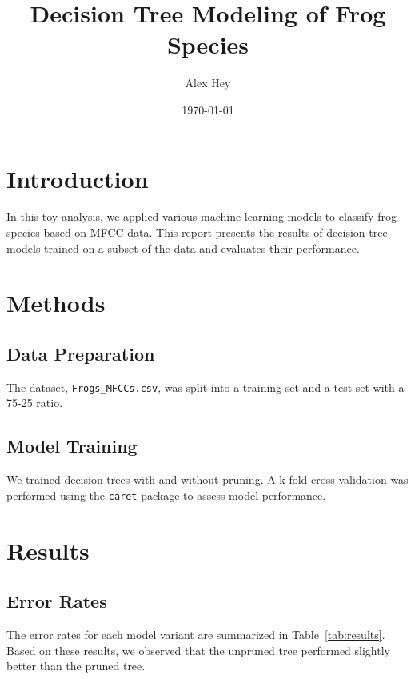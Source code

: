 \documentclass{article}
\title{Decision Tree Modeling of Frog Species}
\author{Alex Hey}
\date{\today}
\begin{document}

\maketitle

\section{Introduction}
In this toy analysis, we applied various machine learning models to classify frog species based on MFCC data. This report presents the results of decision tree models trained on a subset of the data and evaluates their performance.

\section{Methods}
\subsection{Data Preparation}
The dataset, \texttt{Frogs\_MFCCs.csv}, was split into a training set and a test set with a 75-25 ratio. 

\subsection{Model Training}
We trained decision trees with and without pruning. A k-fold cross-validation was performed using the \texttt{caret} package to assess model performance.

\section{Results}
\subsection{Error Rates}
The error rates for each model variant are summarized in Table~\ref{tab:results}. Based on these results, we observed that the unpruned tree performed slightly better than the pruned tree.

\end{document}
